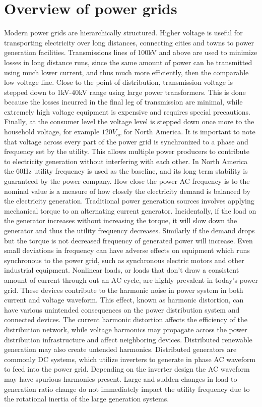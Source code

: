 \section{Overview of power grids}
Modern power grids are hierarchically structured. Higher voltage is useful for transporting electricity over long distances, connecting cities and towns to power generation facilities. Transmissions lines of 100kV and above are used to minimize losses in long distance runs, since the same amount of power can be transmitted using much lower current, and thus much more efficiently, then the comparable low voltage line. Close to the point of distribution, transmission voltage is stepped down to 1kV-40kV range using large power transformers. This is done because the losses incurred in the final leg of transmission are minimal, while extremely high voltage equipment is expensive and requires special precautions.\cite{sivanagaraju2008electric} Finally, at the consumer level the voltage level is stepped down once more to the household voltage, for example $120V_{ac}$ for North America. It is important to note that voltage across every part of the power grid is synchronized to a phase and frequency set by the utility. This allows multiple power producers to contribute to electricity generation without interfering with each other.\cite{blaabjerg2006overview} In North America the 60Hz utility frequency is used as the baseline, and its long term stability is guaranteed by the power company. How close the power AC frequency is to the nominal value is a measure of how closely the electricity demand is balanced by the electricity generation. Traditional power generation sources involves applying mechanical torque to an alternating current generator. Incidentally, if the load on the generator increases without increasing the torque, it will slow down the generator and thus the utility frequency decreases. Similarly if the demand drops but the torque is not decreased frequency of generated power will increase. Even small deviations in frequency can have adverse effects on equipment which runs synchronous to the power grid, such as synchronous electric motors and other industrial equipment.\cite{morren2006wind} Nonlinear loads, or loads that don't draw a consistent amount of current through out an AC cycle, are highly prevalent in today's power grid. These devices contribute to the harmonic noise in power system in both current and voltage waveform. This effect, known as harmonic distortion, can have various unintended consequences on the power distribution system and connected devices. The current harmonic distortion affects the efficiency of the distribution network, while voltage harmonics may propagate across the power distribution infrastructure and affect neighboring devices. Distributed renewable generation may also create untended harmonics. Distributed generators are commonly DC systems, which utilize inverters to generate in phase AC waveform to feed into the power grid. Depending on the inverter design the AC waveform may have spurious harmonics present.\cite{morren2006wind} Large and sudden changes in load to generation ratio change do not immediately impact the utility frequency due to the rotational inertia of the large generation systems. 